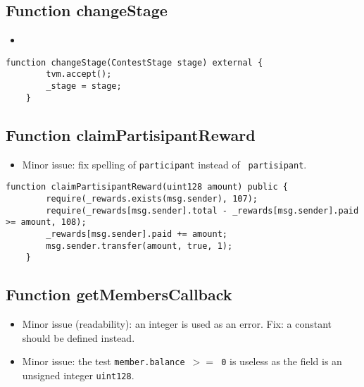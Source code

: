 \subsection{Function changeStage}

\begin{itemize}
\item {}
\end{itemize}

\begin{lstlisting}[firstnumber=234]
    function changeStage(ContestStage stage) external {
        tvm.accept();
        _stage = stage;
    }
\end{lstlisting}

\subsection{Function claimPartisipantReward}

\begin{itemize}
\item Minor issue: fix spelling of {\tt participant} instead of {\tt
  partisipant}.
\end{itemize}

\begin{lstlisting}[firstnumber=197]
    function claimPartisipantReward(uint128 amount) public {
        require(_rewards.exists(msg.sender), 107);
        require(_rewards[msg.sender].total - _rewards[msg.sender].paid >= amount, 108);
        _rewards[msg.sender].paid += amount;
        msg.sender.transfer(amount, true, 1);
    }
\end{lstlisting}

\subsection{Function getMembersCallback}

\begin{itemize}
\item Minor issue (readability): an integer is used as an error. Fix:
  a constant should be defined instead.
\item Minor issue: the test {\tt member.balance $>=$ 0} is useless as
  the field is an unsigned integer {\tt uint128}.
\end{itemize}


